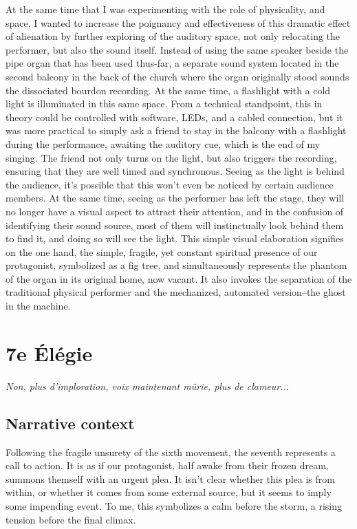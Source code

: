 \documentclass[12pt,twoside,maitrise]{dms_ks}
\theoremstyle{definition}
\begin{document}
At the same time that I was experimenting with the role of physicality, and space, I wanted to increase the poignancy and effectiveness of this dramatic effect of alienation by further exploring of the auditory space, not only relocating the performer, but also the sound itself.
Instead of using the same speaker beside the pipe organ that has been used thus-far, a separate sound system located in the second balcony in the back of the church where the organ originally stood sounds the dissociated bourdon recording.
At the same time, a flashlight with a cold light is illuminated in this same space.
From a technical standpoint, this in theory could be controlled with software, LEDs, and a cabled connection, but it was more practical to simply ask a friend to stay in the balcony with a flashlight during the performance, awaiting the auditory cue, which is the end of my singing.
The friend not only turns on the light, but also triggers the recording, ensuring that they are well timed and synchronous.
Seeing as the light is behind the audience, it's possible that this won't even be noticed by certain audience members.
At the same time, seeing as the performer has left the stage, they will no longer have a visual aspect to attract their attention, and in the confusion of identifying their sound source, most of them will instinctually look behind them to find it, and doing so will see the light.
This simple visual elaboration signifies on the one hand, the simple, fragile, yet constant spiritual presence of our protagonist, symbolized as a fig tree, and simultaneously represents the phantom of the organ in its original home, now vacant.
It also invokes the separation of the traditional physical performer and the mechanized, automated version--the ghost in the machine.

\section{7e Élégie}

\epigraph{\textit{Non, plus d’imploration, voix maintenant mûrie, plus de clameur...}}{}

\subsection{Narrative context}

Following the fragile unsurety of the sixth movement, the seventh represents a call to action. It is as if our protagonist, half awake from their frozen dream, summons themself with an urgent plea. It isn’t clear whether this plea is from within, or whether it comes from some external source, but it seems to imply some impending event. To me, this symbolizes a calm before the storm, a rising tension before the final climax. 
\end{document}
